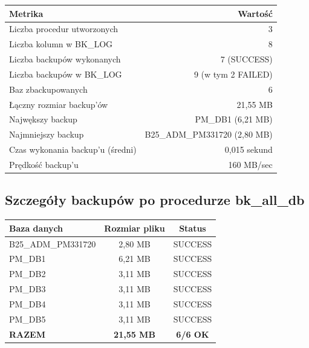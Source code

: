 \documentclass[a4paper,11pt]{article}
\begin{document}
	\begin{center}
		\begin{tabular}{|l|r|}
			\hline
			\textbf{Metrika} & \textbf{Wartość} \\
			\hline
			Liczba procedur utworzonych & 3 \\
			\hline
			Liczba kolumn w BK\_LOG & 8 \\
			\hline
			Liczba backupów wykonanych & 7 (SUCCESS) \\
			\hline
			Liczba backupów w BK\_LOG & 9 (w tym 2 FAILED) \\
			\hline
			Baz zbackupowanych & 6 \\
			\hline
			Łączny rozmiar backup'ów & 21,55 MB \\
			\hline
			Najwększy backup & PM\_DB1 (6,21 MB) \\
			\hline
			Najmniejszy backup & B25\_ADM\_PM331720 (2,80 MB) \\
			\hline
			Czas wykonania backup'u (średni) & ~0,015 sekund \\
			\hline
			Prędkość backup'u & ~160 MB/sec \\
			\hline
		\end{tabular}
	\end{center}
	
	\subsection{Szczegóły backupów po procedurze bk\_all\_db}
	
	\begin{center}
		\begin{tabular}{|l|c|c|}
			\hline
			\textbf{Baza danych} & \textbf{Rozmiar pliku} & \textbf{Status} \\
			\hline
			B25\_ADM\_PM331720 & 2,80 MB & SUCCESS \\
			\hline
			PM\_DB1 & 6,21 MB & SUCCESS \\
			\hline
			PM\_DB2 & 3,11 MB & SUCCESS \\
			\hline
			PM\_DB3 & 3,11 MB & SUCCESS \\
			\hline
			PM\_DB4 & 3,11 MB & SUCCESS \\
			\hline
			PM\_DB5 & 3,11 MB & SUCCESS \\
			\hline
			\textbf{RAZEM} & \textbf{21,55 MB} & \textbf{6/6 OK} \\
			\hline
		\end{tabular}
	\end{center}
	
\end{document}
